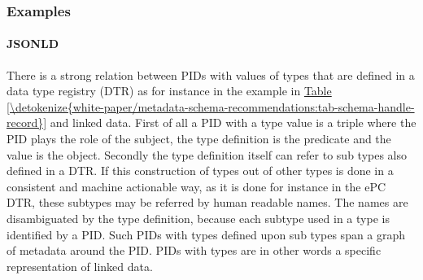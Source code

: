 \documentclass[a4paper,10pt,english]{sphinxmanual}
\begin{document}
\subsubsection{Examples}
\label{\detokenize{white-paper/landing-page-encoding:examples}}

\paragraph{JSON\sphinxhyphen{}LD}
\label{\detokenize{white-paper/landing-page-encoding:json-ld}}
\sphinxAtStartPar
There is a strong relation between PIDs with values of types that are
defined in a data type registry (DTR) as for instance in the
example in \hyperref[\detokenize{white-paper/metadata-schema-recommendations:tab-schema-handle-record}]{Table \ref{\detokenize{white-paper/metadata-schema-recommendations:tab-schema-handle-record}}} and linked data. First
of all a PID with a type value is a triple where the PID plays the
role of the subject, the type definition is the predicate and the
value is the object. Secondly the type definition itself can refer to
sub types also defined in a DTR. If this construction of types out of
other types is done in a consistent and machine actionable way, as it
is done for instance in the ePC DTR, these subtypes may be referred by
human readable names. The names are disambiguated by the type
definition, because each subtype used in a type is identified by a
PID. Such PIDs with types defined upon sub types span a graph of
metadata around the PID. PIDs with types are in other words a specific
representation of linked data.
\end{document}
